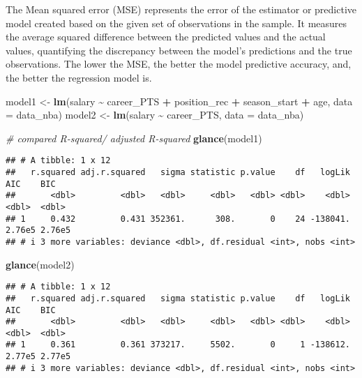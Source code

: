 \documentclass[
]{book}
\newenvironment{Shaded}{\begin{snugshade}}{\end{snugshade}}
\newcommand{\AttributeTok}[1]{\textcolor[rgb]{0.13,0.29,0.53}{#1}}
\newcommand{\CommentTok}[1]{\textcolor[rgb]{0.56,0.35,0.01}{\textit{#1}}}
\newcommand{\FunctionTok}[1]{\textcolor[rgb]{0.13,0.29,0.53}{\textbf{#1}}}
\newcommand{\NormalTok}[1]{#1}
\newcommand{\OtherTok}[1]{\textcolor[rgb]{0.56,0.35,0.01}{#1}}
\newcommand{\SpecialCharTok}[1]{\textcolor[rgb]{0.81,0.36,0.00}{\textbf{#1}}}
\begin{document}
The Mean squared error (MSE) represents the error of the estimator or predictive model created based on the given set of observations in the sample. It measures the average squared difference between the predicted values and the actual values, quantifying the discrepancy between the model's predictions and the true observations. The lower the MSE, the better the model predictive accuracy, and, the better the regression model is.

\begin{Shaded}
\begin{Highlighting}[]
\NormalTok{model1 }\OtherTok{\textless{}{-}} \FunctionTok{lm}\NormalTok{(salary }\SpecialCharTok{\textasciitilde{}}\NormalTok{ career\_PTS }\SpecialCharTok{+}\NormalTok{ position\_rec }\SpecialCharTok{+}\NormalTok{ season\_start }\SpecialCharTok{+}
\NormalTok{             age, }\AttributeTok{data =}\NormalTok{ data\_nba)}
\NormalTok{model2 }\OtherTok{\textless{}{-}} \FunctionTok{lm}\NormalTok{(salary }\SpecialCharTok{\textasciitilde{}}\NormalTok{ career\_PTS, }\AttributeTok{data =}\NormalTok{ data\_nba)}

\CommentTok{\# compared R{-}squared/ adjusted R{-}squared}
\FunctionTok{glance}\NormalTok{(model1)}
\end{Highlighting}
\end{Shaded}

\begin{verbatim}
## # A tibble: 1 x 12
##   r.squared adj.r.squared   sigma statistic p.value    df   logLik    AIC    BIC
##       <dbl>         <dbl>   <dbl>     <dbl>   <dbl> <dbl>    <dbl>  <dbl>  <dbl>
## 1     0.432         0.431 352361.      308.       0    24 -138041. 2.76e5 2.76e5
## # i 3 more variables: deviance <dbl>, df.residual <int>, nobs <int>
\end{verbatim}

\begin{Shaded}
\begin{Highlighting}[]
\FunctionTok{glance}\NormalTok{(model2)}
\end{Highlighting}
\end{Shaded}

\begin{verbatim}
## # A tibble: 1 x 12
##   r.squared adj.r.squared   sigma statistic p.value    df   logLik    AIC    BIC
##       <dbl>         <dbl>   <dbl>     <dbl>   <dbl> <dbl>    <dbl>  <dbl>  <dbl>
## 1     0.361         0.361 373217.     5502.       0     1 -138612. 2.77e5 2.77e5
## # i 3 more variables: deviance <dbl>, df.residual <int>, nobs <int>
\end{verbatim}
\end{document}
